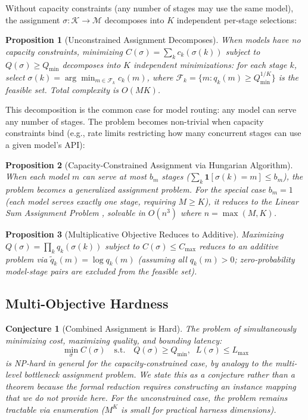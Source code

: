 \documentclass[11pt, a4paper, copyright]{googledeepmind}
\newtheorem{proposition}{Proposition}[section]
\newtheorem{conjecture}{Conjecture}[section]
\begin{document}
Without capacity constraints (any number of stages may use the same model), the assignment $\sigma: \mathcal{K} \to \mathcal{M}$ decomposes into $K$ independent per-stage selections:

\begin{proposition}[Unconstrained Assignment Decomposes]
\label{prop:decompose}
When models have no capacity constraints, minimizing $C(\sigma) = \sum_k c_k(\sigma(k))$ subject to $Q(\sigma) \geq Q_{\min}$ decomposes into $K$ independent minimizations: for each stage $k$, select $\sigma(k) = \arg\min_{m \in \mathcal{F}_k} c_k(m)$, where $\mathcal{F}_k = \{m : q_k(m) \geq Q_{\min}^{1/K}\}$ is the feasible set. Total complexity is $O(MK)$.
\end{proposition}

This decomposition is the common case for model routing: any model can serve any number of stages. The problem becomes non-trivial when capacity constraints bind (e.g., rate limits restricting how many concurrent stages can use a given model's API):

\begin{proposition}[Capacity-Constrained Assignment via Hungarian Algorithm]
\label{prop:hungarian}
When each model $m$ can serve at most $b_m$ stages ($\sum_k \mathbf{1}[\sigma(k) = m] \leq b_m$), the problem becomes a generalized assignment problem. For the special case $b_m = 1$ (each model serves exactly one stage, requiring $M \geq K$), it reduces to the Linear Sum Assignment Problem \citep{kuhn1955, munkres1957}, solvable in $O(n^3)$ where $n = \max(M,K)$.
\end{proposition}

\begin{proposition}[Multiplicative Objective Reduces to Additive]
\label{prop:multiplicative}
Maximizing $Q(\sigma) = \prod_k q_k(\sigma(k))$ subject to $C(\sigma) \leq C_{\max}$ reduces to an additive problem via $\tilde{q}_k(m) = \log q_k(m)$ (assuming all $q_k(m) > 0$; zero-probability model-stage pairs are excluded from the feasible set).
\end{proposition}

\subsection{Multi-Objective Hardness}

\begin{conjecture}[Combined Assignment is Hard]
\label{conj:hard}
The problem of simultaneously minimizing cost, maximizing quality, and bounding latency:
\begin{equation}
\min_{\sigma} C(\sigma) \quad \text{s.t.} \quad Q(\sigma) \geq Q_{\min}, \;\; L(\sigma) \leq L_{\max}
\end{equation}
is NP-hard in general for the capacity-constrained case, by analogy to the multi-level bottleneck assignment problem. We state this as a conjecture rather than a theorem because the formal reduction requires constructing an instance mapping that we do not provide here. For the unconstrained case, the problem remains tractable via enumeration ($M^K$ is small for practical harness dimensions).
\end{conjecture}
\end{document}
